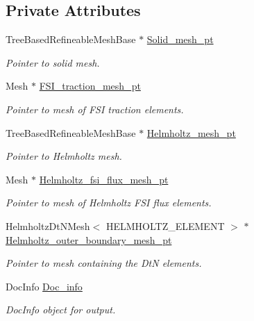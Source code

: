 \subsection*{Private Attributes}
\begin{DoxyCompactItemize}
\item 
Tree\+Based\+Refineable\+Mesh\+Base $\ast$ \hyperlink{classCoatedDiskProblem_aa9e9529dcb4bfd7793b868ab42a5d10e}{Solid\+\_\+mesh\+\_\+pt}
\begin{DoxyCompactList}\small\item\em Pointer to solid mesh. \end{DoxyCompactList}\item 
Mesh $\ast$ \hyperlink{classCoatedDiskProblem_aefeabd04f0fd48be258e57a8b73038b4}{F\+S\+I\+\_\+traction\+\_\+mesh\+\_\+pt}
\begin{DoxyCompactList}\small\item\em Pointer to mesh of F\+SI traction elements. \end{DoxyCompactList}\item 
Tree\+Based\+Refineable\+Mesh\+Base $\ast$ \hyperlink{classCoatedDiskProblem_ad434a37897336e7dfdb720c0b8941c8a}{Helmholtz\+\_\+mesh\+\_\+pt}
\begin{DoxyCompactList}\small\item\em Pointer to Helmholtz mesh. \end{DoxyCompactList}\item 
Mesh $\ast$ \hyperlink{classCoatedDiskProblem_a1737537bbd37b74915e3bfe43e3e4d3e}{Helmholtz\+\_\+fsi\+\_\+flux\+\_\+mesh\+\_\+pt}
\begin{DoxyCompactList}\small\item\em Pointer to mesh of Helmholtz F\+SI flux elements. \end{DoxyCompactList}\item 
Helmholtz\+Dt\+N\+Mesh$<$ H\+E\+L\+M\+H\+O\+L\+T\+Z\+\_\+\+E\+L\+E\+M\+E\+NT $>$ $\ast$ \hyperlink{classCoatedDiskProblem_a142852ffdecdb2f76acf3e4c11ce4b04}{Helmholtz\+\_\+outer\+\_\+boundary\+\_\+mesh\+\_\+pt}
\begin{DoxyCompactList}\small\item\em Pointer to mesh containing the DtN elements. \end{DoxyCompactList}\item 
Doc\+Info \hyperlink{classCoatedDiskProblem_ab389fe08ad443c10ddbdd12127903477}{Doc\+\_\+info}
\begin{DoxyCompactList}\small\item\em Doc\+Info object for output. \end{DoxyCompactList}\item 

\end{DoxyCompactItemize}
